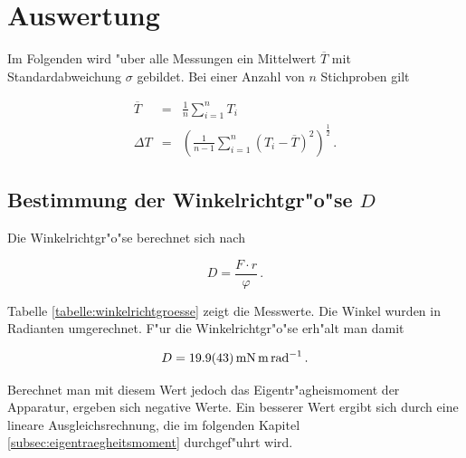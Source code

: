 \section{Auswertung}
\label{sec:auswertung}

	Im Folgenden wird "uber alle Messungen ein Mittelwert $\overline{T}$ mit Standardabweichung $\sigma$ gebildet.
	Bei einer Anzahl von $n$ Stichproben gilt

	\begin{eqnarray}
		\overline{T} & = & \frac{1}{n} \sum_{i = 1}^n{T_i} \nonumber \\
		\Delta T & = & \left(\frac{1}{n-1}\sum_{i = 1}^n {(T_i - \overline{T})^2}\right)^{\frac{1}{2}} \,. \nonumber
	\end{eqnarray}


	\subsection{Bestimmung der Winkelrichtgr"o"se $D$}
	\label{subsec:winkelrichtgroesse}
		Die Winkelrichtgr"o"se berechnet sich nach

		\begin{equation*}
			D = \frac{F \cdot r}{\varphi} \,.
		\end{equation*}

		Tabelle \ref{tabelle:winkelrichtgroesse} zeigt die Messwerte.
		Die Winkel wurden in Radianten umgerechnet.
		F"ur die Winkelrichtgr"o"se erh"alt man damit

		\begin{equation*}
			D = \SI{19.9 (43)}{\milli \newton \meter \per \radian} \,.
		\end{equation*}

		Berechnet man mit diesem Wert jedoch das Eigentr"agheismoment der Apparatur, ergeben sich negative Werte.
		Ein besserer Wert ergibt sich durch eine lineare Ausgleichsrechnung, die im folgenden Kapitel \ref{subsec:eigentraegheitsmoment} durchgef"uhrt wird.

